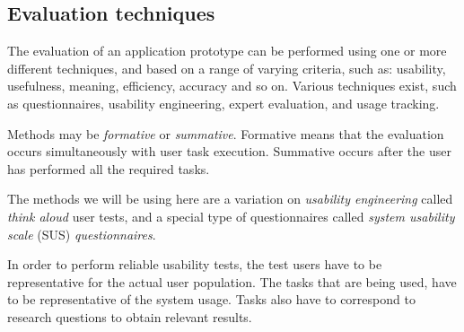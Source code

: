

\subsection{Evaluation techniques}\label{chapter:prototype:section:methodology:subsection:evaluation}

The evaluation of an application prototype can be performed using one or more different techniques, and based on a range of varying criteria, such as: usability, usefulness, meaning, efficiency, accuracy and so on. Various techniques exist, such as questionnaires, usability engineering, expert evaluation, and usage tracking\cite{duval:2012:chi:evaluation}.

Methods may be \emph{formative} or \emph{summative}. Formative means that the evaluation occurs simultaneously with user task execution. Summative occurs after the user has performed all the required tasks\cite{duval:2012:chi:evaluation}.

The methods we will be using here are a variation on \emph{usability engineering} called \emph{think aloud} user tests, and a special type of questionnaires called \emph{system usability scale} (SUS) \emph{questionnaires}.

In order to perform reliable usability tests, the test users have to be representative for the actual user population\cite{duval:2012:chi:evaluation}. The tasks that are being used, have to be representative of the system usage. Tasks also have to correspond to research questions to obtain relevant results\cite{snyder:2003}.

